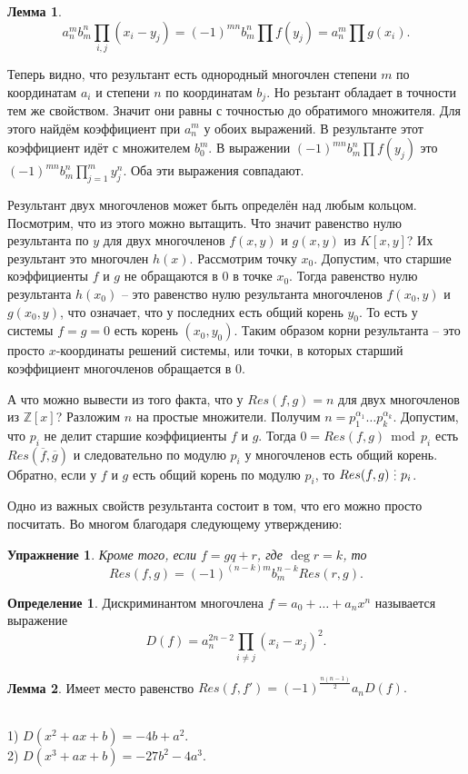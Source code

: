\documentclass[10pt,a4paper,oneside]{book}
\newtheorem{upr}{Упражнение}
\theoremstyle{definition}
\newtheorem*{defn}{{\color{yellow!30!red} Определение}}
\newtheorem{lem}{{\color{green!50!black} Лемма}}
\renewcommand{\mod}{\,\operatorname{mod}\,}
\newcommand{\mb}[1]{\mathbb{#1}}
\newcommand{\ovl}{\overline}
\newcommand{\di}{\mathop{\,\scalebox{0.85}{\raisebox{-1.2pt}[0.5\height]{\vdots}}\,}}
\def\exm{\noindent {\bf Примеры:}}
\def\dfn{\begin{defn}}
\def\edfn{\end{defn}}
\def\lm{\begin{lem}}
\def\elm{\end{lem}}
\def\bupr{\begin{upr}}
\def\eupr{\end{upr}}
\begin{document}
\lm  $$a_n^mb_m^n \prod_{i,j} (x_i-y_j)=(-1)^{mn}b_m^n \prod f(y_j)=a_n^m \prod g(x_i).$$ 
\elm

Теперь видно, что результант есть однородный многочлен степени $m$ по координатам $a_i$ и степени $n$ по координатам $b_j$. Но резьтант обладает в точности тем же свойством. Значит они равны с точностью до обратимого множителя. Для этого найдём коэффициент при $a_n^m$ у обоих выражений. В результанте этот коэффициент идёт с множителем $b_0^m$. В выражении  $(-1)^{mn}b_m^n \prod f(y_j)$ это $(-1)^{mn}b_m^n \prod_{j=1}^m y_j^n$. Оба эти выражения совпадают.

\endproof



Результант двух многочленов может быть определён над любым кольцом. Посмотрим, что из этого можно вытащить. Что значит равенство нулю результанта по $y$ для двух многочленов $f(x,y) $ и $g(x,y)$ из $K[x,y]$? Их результант это многочлен $h(x)$. Рассмотрим точку $x_0$. Допустим, что старшие коэффициенты $f$ и $g$ не обращаются в 0 в точке $x_0$. Тогда равенство нулю результанта $h(x_0)$ -- это равенство нулю результанта многочленов $f(x_0,y)$ и $g(x_0,y)$, что означает, что у последних есть общий корень $y_0$. То есть у системы $f=g=0$ есть корень $(x_0,y_0)$. Таким образом корни результанта -- это  просто $x$-координаты решений системы, или точки, в которых старший коэффициент многочленов обращается в 0.


А что можно вывести из того факта, что у $Res(f,g)=n$ для двух многочленов из $\mb Z[x]$? Разложим $n$ на простые множители. Получим $n=p_1^{\alpha_1} \dots p_k^{\alpha_k}$. Допустим, что $p_i$ не делит старшие коэффициенты $f$ и $g$. Тогда $0=Res(f,g) \mod p_i $ есть $Res(\ovl{f}, \ovl{g})$ и следовательно по модулю $p_i$ у многочленов есть общий корень. Обратно, если у $f$ и $g$ есть общий корень по модулю $p_i$, то $Res(f,g)\di p_i$.

Одно из важных свойств результанта состоит в том, что его можно просто посчитать. Во многом благодаря следующему утверждению:

\bupr Кроме того, если $f=gq+r$, где $\deg r=k$, то 
 $$Res(f,g)=(-1)^{(n-k)m}b_m^{n-k} Res(r,g).$$
\eupr

\dfn Дискриминантом многочлена $f=a_0+\dots +a_nx^n$ называется выражение 
$$D(f)=a_n^{2n-2}\prod_{i\neq j} (x_i-x_j)^2.$$
\edfn

\lm Имеет место равенство $Res(f,f')=(-1)^{\frac{n(n-1)}{2}} a_n D(f).$
\elm

\exm\\
1) $D(x^2+ax+b)=-4b+a^2$.\\
2) $D(x^3+ax+b)=-27b^2-4a^3$.\\
\end{document}
